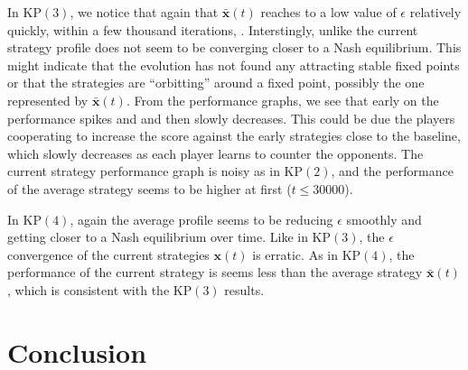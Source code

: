 \documentclass{aamas2014}
\newcommand{\bx}{\mathbf{x}}
\newcommand{\todo}[1]{{\color{red}{\bf #1}}}
\begin{document}
In KP$(3)$, we notice that again that $\bar{\bx}(t)$ reaches to a low value of $\epsilon$ relatively quickly, within 
a few thousand iterations, \todo{reaching $\epsilon \approx 0.00181$ at $t = 74910$}. 
Interstingly, unlike 
the current strategy profile does not seem to be converging closer to a Nash equilibrium. This might indicate that the evolution 
has not found any attracting stable fixed points or that the strategies are ``orbitting'' around a fixed point, possibly the one 
represented by $\bar{\bx}(t)$. 
From the performance graphs, we see that early on the performance spikes and 
and then slowly decreases. This could be due the players cooperating to increase the score against the early 
strategies close to the baseline, which slowly decreases as each player learns to counter the opponents. The current strategy
performance graph is noisy as in KP$(2)$, and the performance of the average strategy seems to be higher at first ($t \le 30000$). 

In KP$(4)$, again the average profile seems to be reducing $\epsilon$ smoothly and getting closer to a Nash equilibrium 
over time. Like in KP$(3)$, the $\epsilon$ convergence of the current strategies $\bx(t)$ is erratic. 
As in KP$(4)$, the performance of the current strategy is seems less than the average 
strategy $\bar{\bx}(t)$, which is consistent with the KP$(3)$ results. 

\section{Conclusion}



%

%
%
\end{document}
